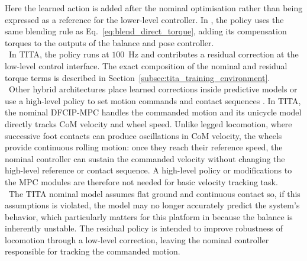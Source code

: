 %
Here the learned action is added after the nominal optimisation rather than
being expressed as a reference for the lower-level controller. In
\cite{hybrid_balance}, the policy uses the same blending rule as
Eq.~\eqref{eq:blend_direct_torque}, adding its compensation torques to the
outputs of the balance and pose controller.\\
\
In TITA, the policy runs at \(100\)~Hz and contributes a residual correction
at the low-level control interface. The exact composition of the nominal and
residual torque terms is described in Section~\ref{subsec:tita_training_environment}.\\
\
Other hybrid architectures place learned corrections inside predictive
models or use a high-level policy to set motion commands and contact
sequences \cite{model_gap,modular_residual,adaptive_mpc,non_gaited,
deep_tracking}. In TITA, the nominal DFCIP-MPC handles the commanded motion
and its unicycle model directly tracks CoM velocity and wheel speed. Unlike
legged locomotion, where successive foot contacts can produce oscillations in
CoM velocity, the wheels provide continuous rolling motion: once they reach
their reference speed, the nominal controller can sustain the commanded
velocity without changing the high-level reference or contact sequence. A
high-level policy or modifications to the MPC modules are therefore not
needed for basic velocity tracking task.\\
\
The TITA nominal model assumes flat ground and continuous contact so,
if this assumptions is violated, the model may no longer accurately 
predict the system's behavior, which particularly 
matters for this platform in because the balance is inherently unstable.
The residual policy is intended
to improve robustness of locomotion through a low-level correction,
leaving the nominal controller responsible for tracking the commanded
motion.

